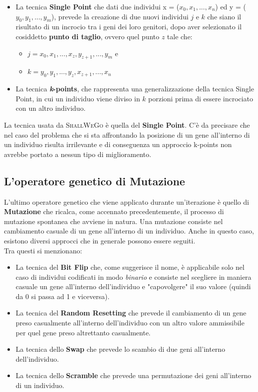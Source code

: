         \begin{itemize}
            \item La tecnica \textbf{Single Point} che dati due individui x = ($x_{0}, x_{1}, ..., x_{n}$) ed y = ($y_{0}, y_{1}, ..., y_{m}$), prevede la creazione di due nuovi individui $j$ e $k$ che siano il risultato di un incrocio tra i geni dei loro genitori, dopo aver selezionato il cosiddetto \textbf{punto di taglio}, ovvero quel punto $z$ tale che:
                \begin{itemize}
                    \item $j = x_{0}, x_{1}, ..., x_{z}, y_{z+1}, ..., y_{m}$ e
                    \item $k = y_{0}, y_{1}, ..., y_{z}, x_{z+1}, ..., x_{n}$
                \end{itemize}
            \item La tecnica \textbf{\textit{k}-points}, che rappresenta una generalizzazione della tecnica Single Point, in cui un individuo viene diviso in \textit{$k$} porzioni prima di essere incrociato con un altro individuo.
        \end{itemize}
        La tecnica usata da \textsc{ShallWeGo} è quella del \textbf{Single Point}. C'è da precisare che nel caso del problema che si sta affrontando la posizione di un gene all'interno di un individuo risulta irrilevante e di conseguenza un approccio k-points non avrebbe portato a nessun tipo di miglioramento.
    \subsection{L'operatore genetico di Mutazione}
        L'ultimo operatore genetico che viene applicato durante un'iterazione è quello di \textbf{Mutazione} che ricalca, come accennato precedentemente, il processo di mutazione spontanea che avviene in natura. Una mutazione consiste nel cambiamento casuale di un gene all'interno di un individuo. Anche in questo caso, esistono diversi approcci che in generale possono essere seguiti. \\
        Tra questi si menzionano:
        \begin{itemize}
            \item La tecnica del \textbf{Bit Flip} che, come suggerisce il nome, è applicabile solo nel caso di individui codificati in modo \textit{binario} e consiste nel scegliere in maniera casuale un gene all'interno dell'individuo e "capovolgere" il suo valore (quindi da 0 si passa ad 1 e viceversa).
            \item La tecnica del \textbf{Random Resetting} che prevede il cambiamento di un gene preso casualmente all'interno dell'individuo con un altro valore ammissibile per quel gene preso altrettanto casualmente.
            \item La tecnica dello \textbf{Swap} che prevede lo scambio di due geni all'interno dell'individuo.
            \item La tecnica dello \textbf{Scramble} che prevede una permutazione dei geni all'interno di un individuo.
        \end{itemize}

